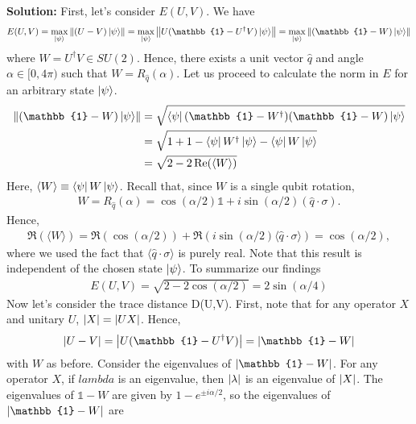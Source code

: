 \documentclass{book}
\begin{document}
    \textbf{Solution:} First, let's consider $E(U,V)$. We have
    \begin{align}
        E(U,V) = \max_{\ket{\psi}} \norm{(U-V)\ket{\psi}} = \max_{\ket{\psi}} \norm{U(\mathbb{1}-U^\dagger V)\ket{\psi}} = \max_{\ket{\psi}} \norm{(\mathbb{1}-W)\ket{\psi}} 
    \end{align}
    where $W = U^\dagger V \in SU(2)$. Hence, there exists a unit vector $\hat{q}$ and angle $\alpha\in [0,4\pi)$ such that $W = R_{\hat{q}}(\alpha)$. Let us proceed to calculate the norm in $E$ for an arbitrary state $\ket{\psi}$.
    \begin{align}
    \begin{aligned}
        \norm{(\mathbb{1}-W)\ket{\psi}} &= \sqrt{\bra{\psi}(\mathbb{1}-W^\dagger)(\mathbb{1}-W)\ket{\psi}} \\
        &= \sqrt{1 + 1 - \bra{\psi}W^\dagger \ket{\psi} - \bra{\psi}W\ket{\psi}} \\
        &= \sqrt{2-2 \Re(\langle W\rangle)}
    \end{aligned}
    \end{align}
    Here, $\langle W \rangle \equiv \bra{\psi} W \ket{\psi}$. Recall that, since $W$ is a single qubit rotation,
    \begin{align}
        W = R_{\hat{q}}(\alpha) = \cos(\alpha/2)\mathbb{1} + i \sin(\alpha/2) (\hat{q}\cdot \sigma).
    \end{align}
    Hence,
    \begin{align}
        \Re(\langle W \rangle) = \Re(\cos(\alpha /2)) + \Re(i \sin(\alpha/2) \langle \hat{q}\cdot \sigma \rangle) = \cos(\alpha/2),
    \end{align}
    where we used the fact that $\langle \hat{q}\cdot \sigma \rangle$ is purely real. Note that this result is independent of the chosen state $\ket{\psi}$. To summarize our findings
    \begin{align} \label{eq:ExerciseA3.1 E(U,V) result}
        E(U,V) = \sqrt{2 - 2 \cos(\alpha/2)} = 2 \sin (\alpha/4)
    \end{align}
    Now let's consider the trace distance D(U,V). First, note that for any operator $X$ and unitary $U$, $\abs{X} = \abs{UX}$. Hence,
    \begin{align}
        \abs{U-V} = \abs{U(\mathbb{1}-U^\dagger V)} = \abs{\mathbb{1}- W}
    \end{align}
    with $W$ as before. Consider the eigenvalues of $\abs{\mathbb{1}- W}$. For any operator $X$, if $lambda$ is an eigenvalue, then $\abs{\lambda}$ is an eigenvalue of $\abs{X}$. The eigenvalues of $\mathbb{1}-W$ are given by $1 - e^{\pm i\alpha/2}$, so the eigenvalues of $\abs{\mathbb{1}- W}$ are
\end{document}
